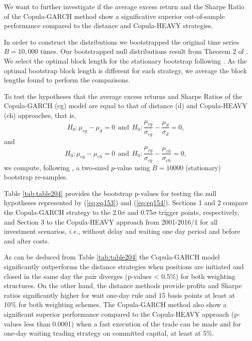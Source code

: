 \documentclass[a4paper,12pt]{report}
\begin{document}
We want to further investigate if the average excess return and the Sharpe Ratio of the Copula-GARCH method show a significative superior out-of-sample performance compared to the distance and Copula-HEAVY strategies. 

In order to construct the distributions we bootstrapped the original time series $B=10,000$ times. Our bootstrapped null distributions result from Theorem 2 of \citet*{pr94}. We select the optimal block length for the stationary bootstrap following \citet*{pw04}. As the optimal bootstrap block length is different for each strategy, we average the block lengths found to perform the comparisons. 

To test the hypotheses that the average excess returns and Sharpe Ratios of the Copula-GARCH (cg) model are equal to that of distance (d) and Copula-HEAVY (ch) approaches, that is,
\begin{equation}
H_{0}:\mu_{cg}-\mu_{d}=0  \ \ \textrm{and}
\ \  H_{0}:\frac{\mu_{cg}}{\sigma_{cg}}-\frac{\mu_{d}}{\sigma_{d}}=0,
\label{eq:eq153}
\end{equation} 
and
\begin{equation}
H_{0}:\mu_{cg}-\mu_{ch}=0  \ \ \textrm{and}
\ \  H_{0}:\frac{\mu_{cg}}{\sigma_{cg}}-\frac{\mu_{ch}}{\sigma_{ch}}=0,
\label{eq:eq154}
\end{equation} we compute, following \citet*{davison1997}, a two-sized $p$-value using $B=10000$ (stationary) bootstrap re-samples. 

Table \ref{tab:table204} provides the bootstrap p-values for testing the null hypotheses represented by (\ref{eq:eq153}) and (\ref{eq:eq154}). Sections 1 and 2 compare the Copula-GARCH strategy to the 2.0$\sigma$ and 0.75$\sigma$ trigger points, respectively, and Section 3 to the Copula-HEAVY approach from 2001-2016/1 for all investment scenarios, \emph{i.e.}, without delay and waiting one day period and before and after costs.

As can be deduced from Table \ref{tab:table204} the Copula-GARCH model significantly outperforms the distance strategies when positions are initiated and closed in the same day the pair diverges (p-values < 0.5\%) for both weighting structures. On the other hand, the distance methods provide profits and Sharpe ratios significantly higher for wait one-day rule and 15 basis points at least at 10\% for both weighting schemes. The Copula-GARCH method also show a significant superior performance compared to the Copula-HEAVY approach (p-values less than 0.0001) when a fast execution of the trade can be made and for one-day waiting trading strategy on committed capital, at least at 5\%.
\end{document}
